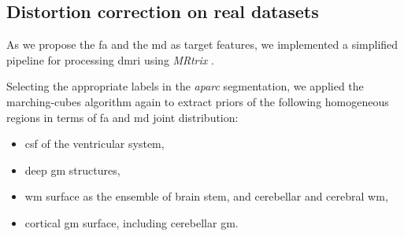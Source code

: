 \subsection*{Distortion correction on real datasets}
\label{sec:results_hcp}

As we propose the \gls*{fa} and the \gls*{md} as target features, we
  implemented a simplified pipeline for processing \gls*{dmri} using
  \emph{MRtrix} \citep{tournier_mrtrix_2012}.

Selecting the appropriate labels in the \emph{aparc} segmentation, we applied
  the marching-cubes algorithm again to extract priors of the following
  homogeneous regions in terms of \gls*{fa} and \gls*{md} joint distribution:
\begin{itemize}
	\item \gls*{csf} of the ventricular system,
	\item deep \gls*{gm} structures,
	\item \gls*{wm} surface as the ensemble of brain stem, and
	  cerebellar and cerebral \gls*{wm},
	\item cortical \gls*{gm} surface, including cerebellar \gls*{gm}.
\end{itemize}

